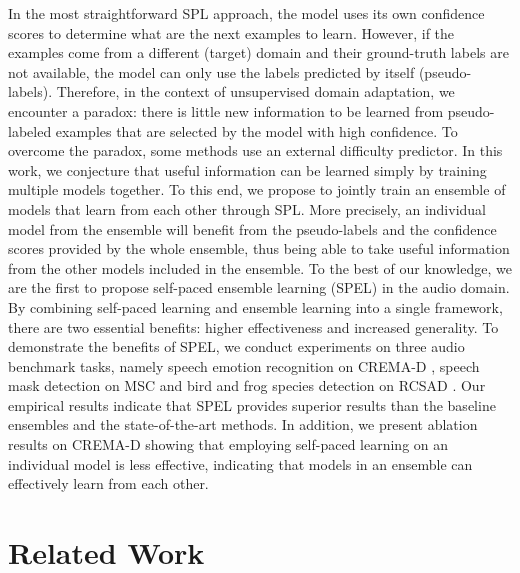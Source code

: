 \documentclass[a4paper]{article}
\begin{document}
In the most straightforward SPL approach, the model uses its own confidence scores to determine what are the next examples to learn. However, if the examples come from a different (target) domain and their ground-truth labels are not available, the model can only use the labels predicted by itself (pseudo-labels). Therefore, in the context of unsupervised domain adaptation, we encounter a paradox: there is little new information to be learned from pseudo-labeled examples that are selected by the model with high confidence. To overcome the paradox, some methods \cite{Soviany-WACV-2020,Soviany-CVIU-2021} use an external difficulty predictor. In this work, we conjecture that useful information can be learned simply by training multiple models together. To this end, we propose to jointly train an ensemble of models that learn from each other through SPL. More precisely, an individual model from the ensemble will benefit from the pseudo-labels and the confidence scores provided by the whole ensemble, thus being able to take useful information from the other models included in the ensemble. To the best of our knowledge, we are the first to propose self-paced ensemble learning (SPEL) in the audio domain.
By combining self-paced learning and ensemble learning into a single framework, there are two essential benefits: higher effectiveness and increased generality. To demonstrate the benefits of SPEL, we conduct experiments on three audio benchmark tasks, namely speech emotion recognition on CREMA-D \cite{Cao-TAC-2014}, speech mask detection on MSC \cite{Schuller-INTERSPEECH-2020} and bird and frog species detection on RCSAD \cite{RFCx}. Our empirical results indicate that SPEL provides superior results than the baseline ensembles and the state-of-the-art methods. In addition, we present ablation results on CREMA-D showing that employing self-paced learning on an individual model is less effective, indicating that models in an ensemble can effectively learn from each other.

\section{Related Work}
\end{document}
